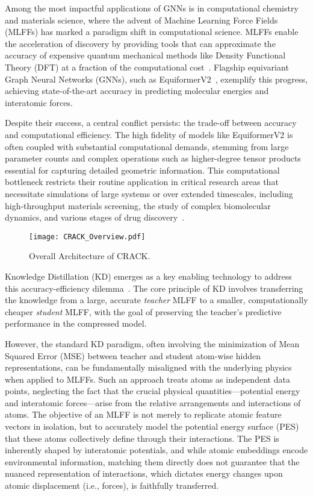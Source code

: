 \documentclass{article}
\begin{document}
Among the most impactful applications of GNNs is in computational chemistry and materials science, where the advent of Machine Learning Force Fields (MLFFs) has marked a paradigm shift in computational science. MLFFs enable the acceleration of discovery by providing tools that can approximate the accuracy of expensive quantum mechanical methods like Density Functional Theory (DFT) at a fraction of the computational cost~\citep{behler2007generalized, schutt2017schnet, unke2021machine}. 
Flagship equivariant Graph Neural Networks (GNNs), such as EquiformerV2~\citep{liao2023equiformerv2}, exemplify this progress, achieving state-of-the-art accuracy in predicting molecular energies and interatomic forces.

Despite their success, a central conflict persists: the trade-off between accuracy and computational efficiency.
The high fidelity of models like EquiformerV2 is often coupled with substantial computational demands, stemming from large parameter counts and complex operations such as higher-degree tensor products essential for capturing detailed geometric information.
This computational bottleneck restricts their routine application in critical research areas that necessitate simulations of large systems or over extended timescales, including high-throughput materials screening, the study of complex biomolecular dynamics, and various stages of drug discovery~\citep{unke2021machine}.

\begin{figure}[!tb]
    \centering
    \texttt{[image: CRACK\_Overview.pdf]}
    \caption{Overall Architecture of CRACK.} \label{fig.CRACK_Overview}
\end{figure}

Knowledge Distillation (KD) emerges as a key enabling technology to address this accuracy-efficiency dilemma~\citep{hinton2015distilling, gou2021knowledge}. 
The core principle of KD involves transferring the knowledge from a large, accurate \emph{teacher} MLFF to a smaller, computationally cheaper \emph{student} MLFF, with the goal of preserving the teacher's predictive performance in the compressed model.

However, the standard KD paradigm, often involving the minimization of Mean Squared Error (MSE) between teacher and student atom-wise hidden representations, can be fundamentally misaligned with the underlying physics when applied to MLFFs.
Such an approach treats atoms as independent data points, neglecting the fact that the crucial physical quantities—potential energy and interatomic forces—arise from the relative arrangements and interactions of atoms. 
The objective of an MLFF is not merely to replicate atomic feature vectors in isolation, but to accurately model the potential energy surface (PES) that these atoms collectively define through their interactions. 
The PES is inherently shaped by interatomic potentials, and while atomic embeddings encode environmental information, matching them directly does not guarantee that the nuanced representation of interactions, which dictates energy changes upon atomic displacement (i.e., forces), is faithfully transferred.
\end{document}
